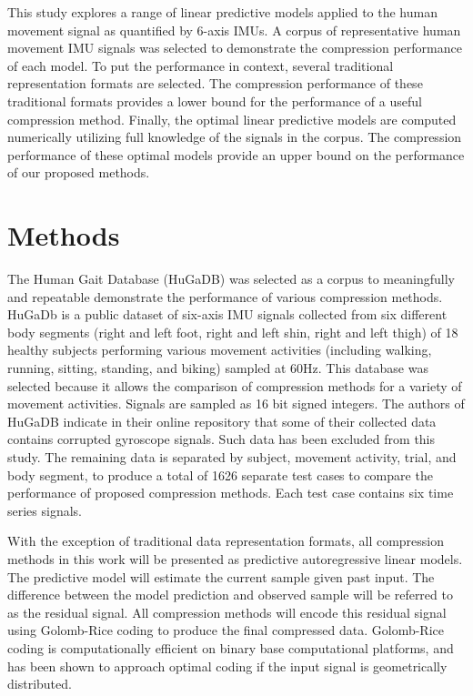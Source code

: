 \documentclass[journal]{IEEEtran}
\begin{document}
This study explores a range of linear predictive models applied to the human movement signal as quantified by 6-axis IMUs. A corpus of representative human movement IMU signals was selected to demonstrate the compression performance of each model. To put the performance in context, several traditional representation formats are selected. The compression performance of these traditional formats provides a lower bound for the performance of a useful compression method. Finally, the optimal linear predictive models are computed numerically utilizing full knowledge of the signals in the corpus. The compression performance of these optimal models provide an upper bound on the performance of our proposed methods.

\section{Methods}


The Human Gait Database (HuGaDB)\cite{Chereshnev2018} was selected as a corpus to meaningfully and repeatable demonstrate the performance of various compression methods. HuGaDb is a public dataset of six-axis IMU signals collected from six different body segments (right and left foot, right and left shin, right and left thigh) of 18 healthy subjects performing various movement activities (including walking, running, sitting, standing, and biking) sampled at 60Hz. This database was selected because it allows the comparison of compression methods for a variety of movement activities. Signals are sampled as 16 bit signed integers. The authors of HuGaDB indicate in their online repository that some of their collected data contains corrupted gyroscope signals. Such data has been excluded from this study. The remaining data is separated by subject, movement activity, trial, and body segment, to produce a total of 1626 separate test cases to compare the performance of proposed compression methods. Each test case contains six time series signals.

With the exception of traditional data representation formats, all compression methods in this work will be presented as predictive autoregressive linear models. The predictive model will estimate the current sample given past input. The difference between the model prediction and observed sample will be referred to as the residual signal. All compression methods will encode this residual signal using Golomb-Rice coding to produce the final compressed data. Golomb-Rice coding is computationally efficient on binary base computational platforms, and has been shown to approach optimal coding if the input signal is geometrically distributed\cite{Golomb1966}\cite{F.Rice1979}.
\end{document}
